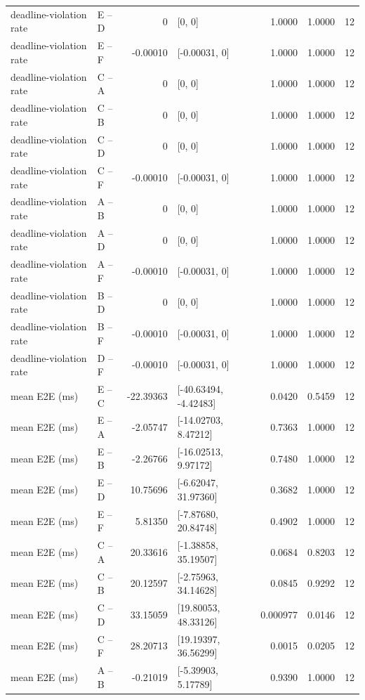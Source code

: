 \documentclass[10pt]{article}
\begin{document}
\begin{longtable}{@{}p{}p{}r p{}rrr@{}}
deadline-violation rate & E -- D & 0 & [0, 0] & 1.0000 & 1.0000 & 12 \\
deadline-violation rate & E -- F & -0.00010 & [-0.00031, 0] & 1.0000 & 1.0000 & 12 \\
deadline-violation rate & C -- A & 0 & [0, 0] & 1.0000 & 1.0000 & 12 \\
deadline-violation rate & C -- B & 0 & [0, 0] & 1.0000 & 1.0000 & 12 \\
deadline-violation rate & C -- D & 0 & [0, 0] & 1.0000 & 1.0000 & 12 \\
deadline-violation rate & C -- F & -0.00010 & [-0.00031, 0] & 1.0000 & 1.0000 & 12 \\
deadline-violation rate & A -- B & 0 & [0, 0] & 1.0000 & 1.0000 & 12 \\
deadline-violation rate & A -- D & 0 & [0, 0] & 1.0000 & 1.0000 & 12 \\
deadline-violation rate & A -- F & -0.00010 & [-0.00031, 0] & 1.0000 & 1.0000 & 12 \\
deadline-violation rate & B -- D & 0 & [0, 0] & 1.0000 & 1.0000 & 12 \\
deadline-violation rate & B -- F & -0.00010 & [-0.00031, 0] & 1.0000 & 1.0000 & 12 \\
deadline-violation rate & D -- F & -0.00010 & [-0.00031, 0] & 1.0000 & 1.0000 & 12 \\
mean E2E (ms) & E -- C & -22.39363 & [-40.63494, -4.42483] & 0.0420 & 0.5459 & 12 \\
mean E2E (ms) & E -- A & -2.05747 & [-14.02703, 8.47212] & 0.7363 & 1.0000 & 12 \\
mean E2E (ms) & E -- B & -2.26766 & [-16.02513, 9.97172] & 0.7480 & 1.0000 & 12 \\
mean E2E (ms) & E -- D & 10.75696 & [-6.62047, 31.97360] & 0.3682 & 1.0000 & 12 \\
mean E2E (ms) & E -- F & 5.81350 & [-7.87680, 20.84748] & 0.4902 & 1.0000 & 12 \\
mean E2E (ms) & C -- A & 20.33616 & [-1.38858, 35.19507] & 0.0684 & 0.8203 & 12 \\
mean E2E (ms) & C -- B & 20.12597 & [-2.75963, 34.14628] & 0.0845 & 0.9292 & 12 \\
mean E2E (ms) & C -- D & 33.15059 & [19.80053, 48.33126] & 0.000977 & 0.0146 & 12 \\
mean E2E (ms) & C -- F & 28.20713 & [19.19397, 36.56299] & 0.0015 & 0.0205 & 12 \\
mean E2E (ms) & A -- B & -0.21019 & [-5.39903, 5.17789] & 0.9390 & 1.0000 & 12 \\

\end{longtable}
\end{document}
